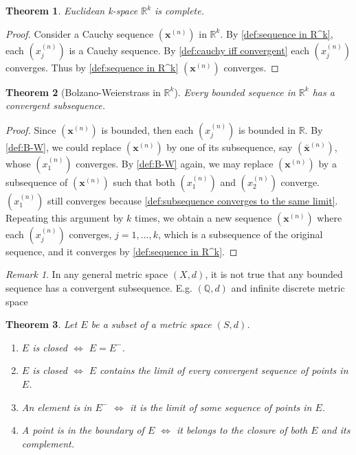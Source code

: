 \documentclass[12pt, lettersize]{book}
\theoremstyle{plain}
\newtheorem{thm}{Theorem}[section]
\theoremstyle{definition}
\theoremstyle{remark}
\newtheorem*{rem}{Remark}
\newcommand{\R}{\mathbb{R}}
\newcommand{\Q}{\mathbb{Q}}
\begin{document}
		\begin{thm}
		Euclidean k-space $\mathbb{R}^k$ is complete.
		\end{thm}
		\begin{proof}
		Consider a Cauchy sequence $(\textbf{x}^{(n)})$ in $\mathbb{R}^k$. By \ref{def:sequence in R^k}, each $(x_j^{(n)})$ is a Cauchy sequence. By \ref{def:cauchy iff convergent} each $(x_j^{(n)})$ converges. Thus by \ref{def:sequence in R^k} $(\textbf{x}^{(n)})$ converges.
		\end{proof}
	
		\begin{thm}[Bolzano-Weierstrass in $\R^k$]
		Every bounded sequence in $\mathbb{R}^k$ has a convergent subsequence.
		\end{thm}
		\begin{proof}
		Since $(\textbf{x}^{(n)})$ is bounded, then each $(x_j^{(n)})$ is bounded in $\mathbb{R}$. By \ref{def:B-W}, we
		could replace $(\textbf{x}^{(n)})$ by one of its subsequence, say $(\bar{\mathbf{x}}^{(n)})$, whose $(x_1^{(n)})$
		converges. By \ref{def:B-W} again, we may replace $(\textbf{x}^{(n)})$ by a subsequence of $(\textbf{x}^{(n)})$ such
		that both $(x_1^{(n)})$ and $(x_2^{(n)})$ converge. $(x_1^{(n)})$ still converges because \ref{def:subsequence converges to the same limit}. Repeating this argument by $k$ times, we obtain a new sequence $(\textbf{x}^{(n)})$ where each $(x_j^{(n)})$ converges, $j=1,\dots,k$, which is a subsequence of the original sequence, and it converges by \ref{def:sequence in R^k}. 
		\end{proof}
		\begin{rem}
		In any general metric space $(X,d)$, it is not true that any bounded sequence has a convergent subsequence. E.g. $(\Q,d)$ and infinite discrete metric space
		\end{rem}
	
		\begin{thm}
			Let $E$ be a subset of a metric space $(S,d)$.
			\begin{enumerate}
				\item $E$ is closed $\iff$ $E=E^-$.
				\item $E$ is closed $\iff$ $E$ contains the limit of every convergent sequence of points in $E$.
				\item An element is in $E^-$ $\iff$ it is the limit of some sequence of points in $E$.
				\item A point is in the boundary of $E$ $\iff$ it belongs to the closure of both $E$ and its complement.
			\end{enumerate}
		\end{thm}
	
\end{document}
